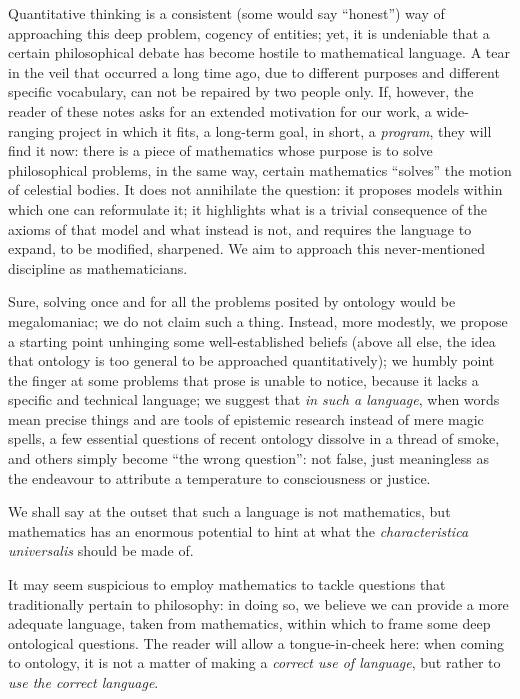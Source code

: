 Quantitative thinking is a consistent (some would say ``honest'') way of approaching this deep problem, cogency of entities; yet, it is undeniable that a certain philosophical debate has become hostile to mathematical language. A tear in the veil that occurred a long time ago, due to different purposes and different specific vocabulary, can not be repaired by two people only. If, however, the reader of these notes asks for an extended motivation for our work, a wide-ranging project in which it fits, a long-term goal, in short, a \emph{program}, they will find it now: there is a piece of mathematics whose purpose is to solve philosophical problems, in the same way, certain mathematics ``solves'' the motion of celestial bodies. It does not annihilate the question: it proposes models within which one can reformulate it; it highlights what is a trivial consequence of the axioms of that model and what instead is not, and requires the language to expand, to be modified, sharpened. We aim to approach this never-mentioned discipline as mathematicians.

Sure, solving once and for all the problems posited by ontology would be megalomaniac; we do not claim such a thing. Instead, more modestly, we propose a starting point unhinging some well-established beliefs (above all else, the idea that ontology is too general to be approached quantitatively); we humbly point the finger at some problems that prose is unable to notice, because it lacks a specific and technical language; we suggest that \emph{in such a language}, when words mean precise things and are tools of epistemic research instead of mere magic spells, a few essential questions of recent ontology dissolve in a thread of smoke, and others simply become ``the wrong question'': not false, just meaningless as the endeavour to attribute a temperature to consciousness or justice.

We shall say at the outset that such a language is not mathematics, but mathematics has an enormous potential to hint at what the \emph{characteristica universalis} should be made of.

It may seem suspicious to employ mathematics to tackle questions that traditionally pertain to philosophy: in doing so, we believe we can provide a more adequate language, taken from mathematics, within which to frame some deep ontological questions. The reader will allow a tongue-in-cheek here: when coming to ontology, it is not a matter of making a \emph{correct use of language}, but rather to \emph{use the correct language}.

